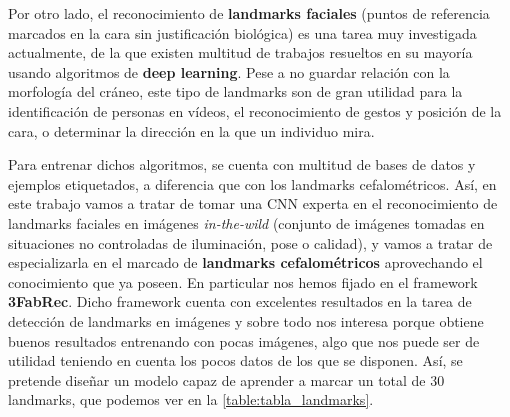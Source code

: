     \medskip 

    \noindent Por otro lado, el reconocimiento de \textbf{landmarks faciales} (puntos de referencia marcados en la cara sin justificación biológica) es una tarea muy investigada actualmente, de la que existen  multitud de trabajos resueltos en su mayoría usando algoritmos de \textbf{deep learning}. Pese a no guardar relación con la morfología del cráneo, este tipo de landmarks son de gran utilidad para la identificación de personas en vídeos, el reconocimiento de gestos y posición de la cara, o determinar la dirección en la que un individuo mira. 

    \medskip

    \noindent Para entrenar dichos algoritmos, se cuenta con multitud de bases de datos y ejemplos etiquetados, a diferencia que con los landmarks cefalométricos. Así, en este trabajo vamos a tratar de tomar una CNN experta en el reconocimiento de landmarks faciales en imágenes \textit{in-the-wild} (conjunto de imágenes tomadas en situaciones no controladas de iluminación, pose o calidad), y vamos a tratar de especializarla en el marcado de \textbf{landmarks cefalométricos} aprovechando el conocimiento que ya poseen. En particular nos hemos fijado en el framework \textbf{3FabRec}\cite{browatzki20203fabrec}. Dicho framework cuenta con excelentes resultados en la tarea de detección de landmarks en imágenes y sobre todo nos interesa porque obtiene buenos resultados entrenando con pocas imágenes, algo que nos puede ser de utilidad teniendo en cuenta los pocos datos de los que se disponen. Así, se pretende diseñar un modelo capaz de aprender a marcar un total de $30$ landmarks, que podemos ver en la \autoref{table:tabla_landmarks}. 


